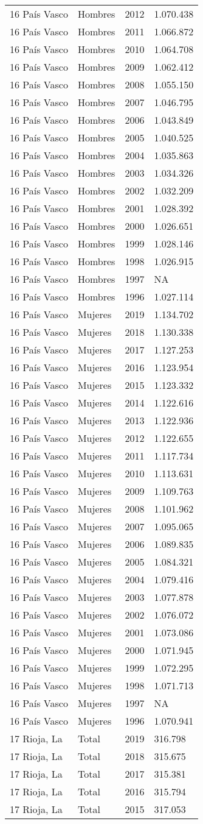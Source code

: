 \documentclass[
]{article}
\begin{document}
\begin{longtable}[]{@{}llrl@{}}
16 País Vasco & Hombres & 2012 & 1.070.438\tabularnewline
16 País Vasco & Hombres & 2011 & 1.066.872\tabularnewline
16 País Vasco & Hombres & 2010 & 1.064.708\tabularnewline
16 País Vasco & Hombres & 2009 & 1.062.412\tabularnewline
16 País Vasco & Hombres & 2008 & 1.055.150\tabularnewline
16 País Vasco & Hombres & 2007 & 1.046.795\tabularnewline
16 País Vasco & Hombres & 2006 & 1.043.849\tabularnewline
16 País Vasco & Hombres & 2005 & 1.040.525\tabularnewline
16 País Vasco & Hombres & 2004 & 1.035.863\tabularnewline
16 País Vasco & Hombres & 2003 & 1.034.326\tabularnewline
16 País Vasco & Hombres & 2002 & 1.032.209\tabularnewline
16 País Vasco & Hombres & 2001 & 1.028.392\tabularnewline
16 País Vasco & Hombres & 2000 & 1.026.651\tabularnewline
16 País Vasco & Hombres & 1999 & 1.028.146\tabularnewline
16 País Vasco & Hombres & 1998 & 1.026.915\tabularnewline
16 País Vasco & Hombres & 1997 & NA\tabularnewline
16 País Vasco & Hombres & 1996 & 1.027.114\tabularnewline
16 País Vasco & Mujeres & 2019 & 1.134.702\tabularnewline
16 País Vasco & Mujeres & 2018 & 1.130.338\tabularnewline
16 País Vasco & Mujeres & 2017 & 1.127.253\tabularnewline
16 País Vasco & Mujeres & 2016 & 1.123.954\tabularnewline
16 País Vasco & Mujeres & 2015 & 1.123.332\tabularnewline
16 País Vasco & Mujeres & 2014 & 1.122.616\tabularnewline
16 País Vasco & Mujeres & 2013 & 1.122.936\tabularnewline
16 País Vasco & Mujeres & 2012 & 1.122.655\tabularnewline
16 País Vasco & Mujeres & 2011 & 1.117.734\tabularnewline
16 País Vasco & Mujeres & 2010 & 1.113.631\tabularnewline
16 País Vasco & Mujeres & 2009 & 1.109.763\tabularnewline
16 País Vasco & Mujeres & 2008 & 1.101.962\tabularnewline
16 País Vasco & Mujeres & 2007 & 1.095.065\tabularnewline
16 País Vasco & Mujeres & 2006 & 1.089.835\tabularnewline
16 País Vasco & Mujeres & 2005 & 1.084.321\tabularnewline
16 País Vasco & Mujeres & 2004 & 1.079.416\tabularnewline
16 País Vasco & Mujeres & 2003 & 1.077.878\tabularnewline
16 País Vasco & Mujeres & 2002 & 1.076.072\tabularnewline
16 País Vasco & Mujeres & 2001 & 1.073.086\tabularnewline
16 País Vasco & Mujeres & 2000 & 1.071.945\tabularnewline
16 País Vasco & Mujeres & 1999 & 1.072.295\tabularnewline
16 País Vasco & Mujeres & 1998 & 1.071.713\tabularnewline
16 País Vasco & Mujeres & 1997 & NA\tabularnewline
16 País Vasco & Mujeres & 1996 & 1.070.941\tabularnewline
17 Rioja, La & Total & 2019 & 316.798\tabularnewline
17 Rioja, La & Total & 2018 & 315.675\tabularnewline
17 Rioja, La & Total & 2017 & 315.381\tabularnewline
17 Rioja, La & Total & 2016 & 315.794\tabularnewline
17 Rioja, La & Total & 2015 & 317.053\tabularnewline

\end{longtable}
\end{document}
